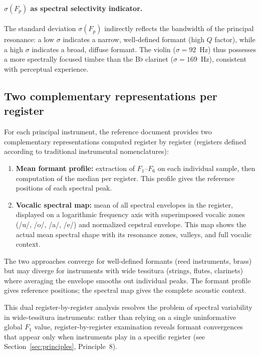 \documentclass[12pt,a4paper]{article}
\begin{document}
\paragraph{$\sigma(F_p)$ as spectral selectivity indicator.}
The standard deviation $\sigma(F_p)$ indirectly reflects the bandwidth of the
principal resonance: a low $\sigma$ indicates a narrow, well-defined formant
(high $Q$ factor), while a high $\sigma$ indicates a broad, diffuse formant.
The violin ($\sigma = 92$~Hz) thus possesses a more spectrally focused timbre
than the B$\flat$ clarinet ($\sigma = 169$~Hz), consistent with perceptual
experience.

\subsection{Two complementary representations per register}

For each principal instrument, the reference document provides two
complementary representations computed register by register (registers defined
according to traditional instrumental nomenclatures):

\begin{enumerate}
\item \textbf{Mean formant profile:} extraction of $F_1$--$F_6$ on each
individual sample, then computation of the median per register. This profile
gives the reference positions of each spectral peak.

\item \textbf{Vocalic spectral map:} mean of all spectral envelopes in the
register, displayed on a logarithmic frequency axis with superimposed vocalic
zones (/u/, /o/, /a/, /e/) and normalized cepstral envelope. This map shows the
actual mean spectral shape with its resonance zones, valleys, and full vocalic
context.
\end{enumerate}

The two approaches converge for well-defined formants (reed instruments, brass)
but may diverge for instruments with wide tessitura (strings, flutes, clarinets)
where averaging the envelope smooths out individual peaks. The formant profile
gives reference positions; the spectral map gives the complete acoustic context.

This dual register-by-register analysis resolves the problem of spectral
variability in wide-tessitura instruments: rather than relying on a single
uninformative global $F_1$ value, register-by-register examination reveals
formant convergences that appear only when instruments play in a specific
register (see Section~\ref{sec:principles}, Principle~8).
\end{document}

